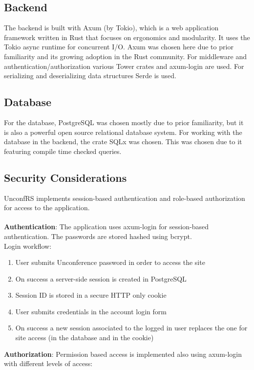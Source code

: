 \subsection{Backend}
The backend is built with Axum (by Tokio), which is a web application framework written in Rust that focuses on ergonomics and modularity. It uses the Tokio async runtime for concurrent I/O. Axum was chosen here due to prior familiarity and its growing adoption in the Rust community. For middleware and authentication/authorization various Tower crates and axum-login are used. For serializing and deserializing data structures Serde is used.

\subsection{Database}
For the database, PostgreSQL was chosen mostly due to prior familiarity, but it is also a powerful open source relational database system. For working with the database in the backend, the crate SQLx was chosen. This was chosen due to it featuring compile time checked queries.

\subsection{Security Considerations}
UnconfRS implements session-based authentication and role-based authorization for access to the application.\\\\
\textbf{Authentication}:
The application uses axum-login for session-based authentication. The passwords are stored hashed using bcrypt.\\
Login workflow:
\begin{enumerate}
    \item User submits Unconference password in order to access the site
    \item On success a server-side session is created in PostgreSQL
    \item Session ID is stored in a secure HTTP only cookie
    \item User submits credentials in the account login form
    \item On success a new session associated to the logged in user replaces the one for site access (in the database and in the cookie)
\end{enumerate}

\textbf{Authorization}:
Permission based access is implemented also using axum-login with different levels of access:

